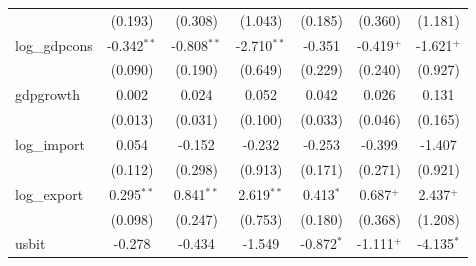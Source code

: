 \begin{tabular}{lcccccc}
                                          & (0.193)                                     & (0.308)                   & (1.043)                       & (0.185)                                     & (0.360)                   & (1.181)\\   
   log\_gdpcons                           & -0.342$^{**}$                               & -0.808$^{**}$             & -2.710$^{**}$                 & -0.351                                      & -0.419$^{+}$              & -1.621$^{+}$\\   
                                          & (0.090)                                     & (0.190)                   & (0.649)                       & (0.229)                                     & (0.240)                   & (0.927)\\   
   gdpgrowth                              & 0.002                                       & 0.024                     & 0.052                         & 0.042                                       & 0.026                     & 0.131\\   
                                          & (0.013)                                     & (0.031)                   & (0.100)                       & (0.033)                                     & (0.046)                   & (0.165)\\   
   log\_import                            & 0.054                                       & -0.152                    & -0.232                        & -0.253                                      & -0.399                    & -1.407\\   
                                          & (0.112)                                     & (0.298)                   & (0.913)                       & (0.171)                                     & (0.271)                   & (0.921)\\   
   log\_export                            & 0.295$^{**}$                                & 0.841$^{**}$              & 2.619$^{**}$                  & 0.413$^{*}$                                 & 0.687$^{+}$               & 2.437$^{+}$\\   
                                          & (0.098)                                     & (0.247)                   & (0.753)                       & (0.180)                                     & (0.368)                   & (1.208)\\   
   usbit                                  & -0.278                                      & -0.434                    & -1.549                        & -0.872$^{*}$                                & -1.111$^{+}$              & -4.135$^{*}$\\   

\end{tabular}
